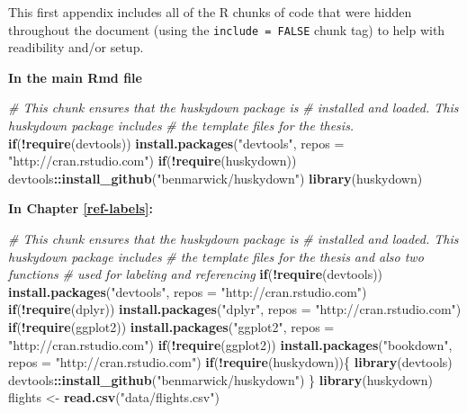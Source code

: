 \documentclass [11pt, proquest] {uwthesis}[2015/03/03]
\newenvironment{Shaded}{}{}
\newcommand{\KeywordTok}[1]{\textcolor[rgb]{0.00,0.44,0.13}{\textbf{{#1}}}}
\newcommand{\DataTypeTok}[1]{\textcolor[rgb]{0.56,0.13,0.00}{{#1}}}
\newcommand{\StringTok}[1]{\textcolor[rgb]{0.25,0.44,0.63}{{#1}}}
\newcommand{\CommentTok}[1]{\textcolor[rgb]{0.38,0.63,0.69}{\textit{{#1}}}}
\newcommand{\NormalTok}[1]{{#1}}
\newcommand{\OperatorTok}[1]{\textcolor[rgb]{0.00,0.44,0.13}{\textbf{{#1}}}}
\newcommand{\ControlFlowTok}[1]{\textcolor[rgb]{0.00,0.44,0.13}{\textbf{{#1}}}}
\begin{document}
This first appendix includes all of the R chunks of code that were
hidden throughout the document (using the \texttt{include\ =\ FALSE}
chunk tag) to help with readibility and/or setup.

\textbf{In the main Rmd file}
\begin{Shaded}
\begin{Highlighting}[]
\CommentTok{# This chunk ensures that the huskydown package is}
\CommentTok{# installed and loaded. This huskydown package includes}
\CommentTok{# the template files for the thesis.}
\ControlFlowTok{if}\NormalTok{(}\OperatorTok{!}\KeywordTok{require}\NormalTok{(devtools))}
  \KeywordTok{install.packages}\NormalTok{(}\StringTok{"devtools"}\NormalTok{, }\DataTypeTok{repos =} \StringTok{"http://cran.rstudio.com"}\NormalTok{)}
\ControlFlowTok{if}\NormalTok{(}\OperatorTok{!}\KeywordTok{require}\NormalTok{(huskydown))}
\NormalTok{  devtools}\OperatorTok{::}\KeywordTok{install_github}\NormalTok{(}\StringTok{"benmarwick/huskydown"}\NormalTok{)}
\KeywordTok{library}\NormalTok{(huskydown)}
\end{Highlighting}
\end{Shaded}
\textbf{In Chapter \ref{ref-labels}:}
\begin{Shaded}
\begin{Highlighting}[]
\CommentTok{# This chunk ensures that the huskydown package is}
\CommentTok{# installed and loaded. This huskydown package includes}
\CommentTok{# the template files for the thesis and also two functions}
\CommentTok{# used for labeling and referencing}
\ControlFlowTok{if}\NormalTok{(}\OperatorTok{!}\KeywordTok{require}\NormalTok{(devtools))}
  \KeywordTok{install.packages}\NormalTok{(}\StringTok{"devtools"}\NormalTok{, }\DataTypeTok{repos =} \StringTok{"http://cran.rstudio.com"}\NormalTok{)}
\ControlFlowTok{if}\NormalTok{(}\OperatorTok{!}\KeywordTok{require}\NormalTok{(dplyr))}
    \KeywordTok{install.packages}\NormalTok{(}\StringTok{"dplyr"}\NormalTok{, }\DataTypeTok{repos =} \StringTok{"http://cran.rstudio.com"}\NormalTok{)}
\ControlFlowTok{if}\NormalTok{(}\OperatorTok{!}\KeywordTok{require}\NormalTok{(ggplot2))}
    \KeywordTok{install.packages}\NormalTok{(}\StringTok{"ggplot2"}\NormalTok{, }\DataTypeTok{repos =} \StringTok{"http://cran.rstudio.com"}\NormalTok{)}
\ControlFlowTok{if}\NormalTok{(}\OperatorTok{!}\KeywordTok{require}\NormalTok{(ggplot2))}
    \KeywordTok{install.packages}\NormalTok{(}\StringTok{"bookdown"}\NormalTok{, }\DataTypeTok{repos =} \StringTok{"http://cran.rstudio.com"}\NormalTok{)}
\ControlFlowTok{if}\NormalTok{(}\OperatorTok{!}\KeywordTok{require}\NormalTok{(huskydown))\{}
  \KeywordTok{library}\NormalTok{(devtools)}
\NormalTok{  devtools}\OperatorTok{::}\KeywordTok{install_github}\NormalTok{(}\StringTok{"benmarwick/huskydown"}\NormalTok{)}
\NormalTok{  \}}
\KeywordTok{library}\NormalTok{(huskydown)}
\NormalTok{flights <-}\StringTok{ }\KeywordTok{read.csv}\NormalTok{(}\StringTok{"data/flights.csv"}\NormalTok{)}
\end{Highlighting}
\end{Shaded}
\end{document}
